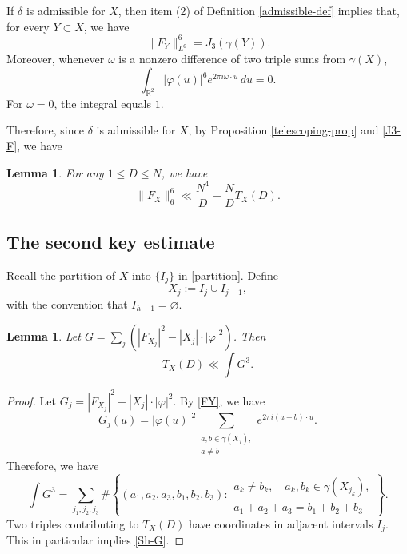 \documentclass{amsart}
\numberwithin{equation}{section}
\newtheorem{lemma}[theorem]{Lemma}
\newcommand{\vp}{\varphi}
\newcommand{\R}{\mathbb{R}}
\begin{document}
\medskip

If $\delta$ is admissible for $X$, then item (2) of Definition \ref{admissible-def} implies that, for every $Y\subset X$, we have
\begin{equation}
    \label{J3-F}
    \|F_Y\|_{L^6}^6=J_3(\gamma(Y)). 
\end{equation}
Moreover, whenever $\omega$ is a nonzero difference of two triple sums from $\gamma(X)$,
\begin{equation}
    \nonumber
    \int_{\R^2}|\vp(u)|^6 e^{2\pi i\omega\cdot u}\,du=0.
\end{equation}
For $\omega=0$, the integral equals $1$.

\medskip

Therefore, since $\delta$ is admissible for $X$, by Proposition \ref{telescoping-prop} and \eqref{J3-F}, we have
\begin{lemma}
    \label{telescoping-lemma-delta}
    For any $1\leq D\leq N$, we have 
    \[
    \|F_X\|_6^6\ll \frac{N^4}{D}+ \frac{N}{D} T_X(D).
    \]
\end{lemma}


\bigskip 

\subsection{The second key estimate}



Recall the partition of $X$ into $\{I_j\}$ in \eqref{partition}.
Define
\begin{equation}
    \nonumber
    X_j:= I_j\cup I_{j+1},
\end{equation}
with the convention that $I_{h+1}=\varnothing$.

\begin{lemma}
    \label{Sh-G-lem}
    Let $G=\sum_j(|F_{X_j}|^2-|X_j|\cdot |\vp|^2)$.
    Then
    \begin{equation}
        \label{Sh-G}
        T_X(D)\ll\int G^3.
    \end{equation}
\end{lemma}
\begin{proof}
    Let $G_j=|F_{X_j}|^2-|X_j|\cdot |\vp|^2$.
    By \eqref{FY}, we have
    \[
    G_j(u)
    =
    |\vp(u)|^2
    \sum_{\substack{a,b\in\gamma(X_j),\\a\neq b}}
    e^{2\pi i(a-b)\cdot u}.
    \]
    Therefore, we have
    \[
    \int G^3=
    \sum_{j_1,j_2,j_3}
    \#\left\{
    (a_1,a_2,a_3,b_1,b_2,b_3):
    \begin{array}{l}
        a_k\not= b_k,\quad a_k, b_k\in \gamma(X_{j_k}),\\[2mm]
        a_1+a_2+a_3=b_1+b_2+b_3
    \end{array}
    \right\}.
    \]
    Two triples contributing to $T_X(D)$ have coordinates in adjacent intervals $I_j$.
    This in particular implies \eqref{Sh-G}.
    \qedhere
    
\end{proof}
\end{document}
